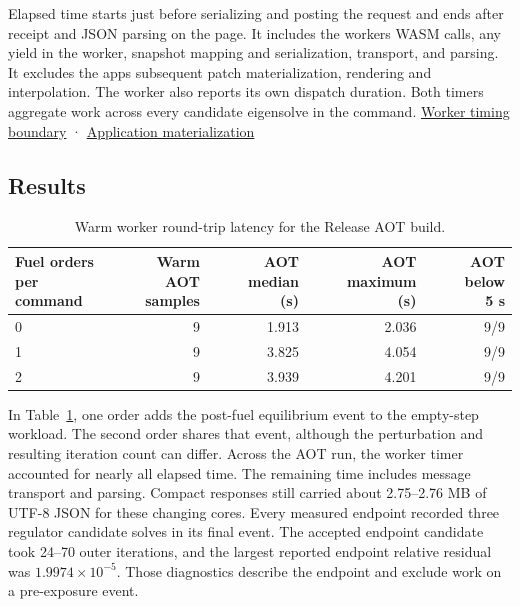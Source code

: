 \documentclass[11pt,letterpaper]{article}
\begin{document}
Elapsed time starts just before serializing and posting the request and ends after
receipt and JSON parsing on the page. It includes the worker\textquotesingle s WASM
calls, any yield in the worker, snapshot mapping and serialization, transport, and
parsing. It excludes the app\textquotesingle s subsequent patch materialization,
rendering and interpolation. The worker also reports its own dispatch duration. Both
timers aggregate work across every candidate eigensolve in the command.
\href{https://github.com/hkkho/CRS/blob/4341ae8881f5827988c3d8b1859aa9e8f13cd8a6/web/candu-playtest/src/wasmWorker.ts\#L35}{Worker
timing boundary} ·
\href{https://github.com/hkkho/CRS/blob/4341ae8881f5827988c3d8b1859aa9e8f13cd8a6/web/candu-playtest/src/bridge.ts\#L451}{Application
materialization}

\subsection{Results}\label{results}

\begin{table}[!htbp]
\centering
\caption{Warm worker round-trip latency for the Release AOT build.}
\label{tab:aot}
\small
\begin{tabular*}{\linewidth}{@{\extracolsep{\fill}}lrrrr@{}}
\toprule
\shortstack[l]{Fuel orders\\per command} &
\shortstack[r]{Warm AOT\\samples} &
\shortstack[r]{AOT median\\(s)} &
\shortstack[r]{AOT maximum\\(s)} &
\shortstack[r]{AOT below\\5 s} \\
\midrule
0 & 9 & 1.913 & 2.036 & 9/9 \\
1 & 9 & 3.825 & 4.054 & 9/9 \\
2 & 9 & 3.939 & 4.201 & 9/9 \\
\bottomrule
\end{tabular*}
\end{table}

In Table~\ref{tab:aot}, one order adds the post-fuel equilibrium event to the empty-step workload. The second
order shares that event, although the perturbation and resulting iteration count can
differ. Across the AOT run, the worker timer accounted for nearly all elapsed time. The
remaining time includes message transport and parsing. Compact responses still carried
about 2.75--2.76 MB of UTF-8 JSON for these changing cores. Every measured endpoint
recorded three regulator candidate solves in its final event. The accepted endpoint
candidate took 24--70 outer iterations, and the largest reported endpoint relative
residual was \(1.9974\times10^{-5}\). Those diagnostics describe the endpoint and
exclude work on a pre-exposure event.
\end{document}
